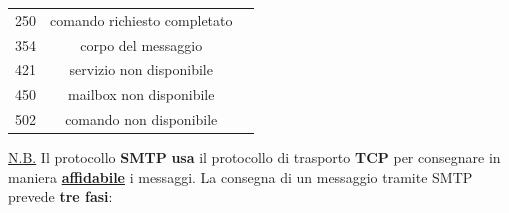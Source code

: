 \documentclass[11pt,a4paper]{article}
\theoremstyle{definition}
\begin{document}
\begin{itemize}
\begin{table}[h!]
\begin{center}
\begin{tabular}{l|c|c}
				      250             & comando richiesto completato             \\
				      354             & corpo del messaggio                      \\
				      421             & servizio non disponibile                 \\
				      450             & mailbox non disponibile                  \\
				      502             & comando non disponibile                  \\
			      \end{tabular}
		      \end{center}
	      \end{table}
\end{itemize}
\newpage
\underline{N.B.} Il protocollo \textbf{SMTP} \textbf{usa} il protocollo di trasporto \textbf{TCP} per consegnare in maniera \textbf{\underline{affidabile}} i messaggi.\newline\newline
La consegna di un messaggio tramite SMTP prevede \textbf{tre fasi}:
\end{document}
